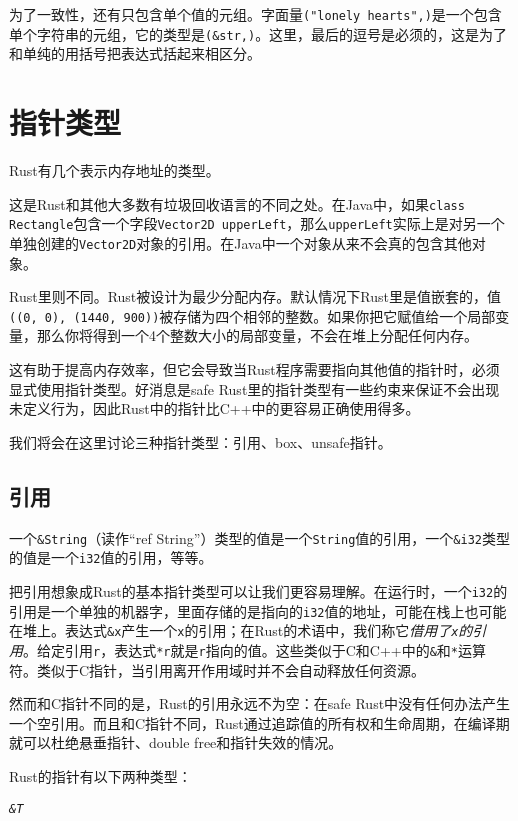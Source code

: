 为了一致性，还有只包含单个值的元组。字面量\texttt{("lonely hearts",)}是一个包含单个字符串的元组，它的类型是\texttt{(\&str,)}。这里，最后的逗号是必须的，这是为了和单纯的用括号把表达式括起来相区分。

\section{指针类型}
Rust有几个表示内存地址的类型。

这是Rust和其他大多数有垃圾回收语言的不同之处。在Java中，如果\texttt{class Rectangle}包含一个字段\texttt{Vector2D upperLeft}，那么\texttt{upperLeft}实际上是对另一个单独创建的\texttt{Vector2D}对象的引用。在Java中一个对象从来不会真的包含其他对象。

Rust里则不同。Rust被设计为最少分配内存。默认情况下Rust里是值嵌套的，值\texttt{((0, 0), (1440, 900))}被存储为四个相邻的整数。如果你把它赋值给一个局部变量，那么你将得到一个4个整数大小的局部变量，不会在堆上分配任何内存。

这有助于提高内存效率，但它会导致当Rust程序需要指向其他值的指针时，必须显式使用指针类型。好消息是safe Rust里的指针类型有一些约束来保证不会出现未定义行为，因此Rust中的指针比C++中的更容易正确使用得多。

我们将会在这里讨论三种指针类型：引用、box、unsafe指针。

\subsection{引用}

一个\texttt{\&String}（读作“ref String”）类型的值是一个\texttt{String}值的引用，一个\texttt{\&i32}类型的值是一个\texttt{i32}值的引用，等等。

把引用想象成Rust的基本指针类型可以让我们更容易理解。在运行时，一个\texttt{i32}的引用是一个单独的机器字，里面存储的是指向的\texttt{i32}值的地址，可能在栈上也可能在堆上。表达式\texttt{\&x}产生一个\texttt{x}的引用；在Rust的术语中，我们称它\emph{借用了\texttt{x}的引用}。给定引用\texttt{r}，表达式\texttt{*r}就是\texttt{r}指向的值。这些类似于C和C++中的\texttt{\&}和\texttt{*}运算符。类似于C指针，当引用离开作用域时并不会自动释放任何资源。

然而和C指针不同的是，Rust的引用永远不为空：在safe Rust中没有任何办法产生一个空引用。而且和C指针不同，Rust通过追踪值的所有权和生命周期，在编译期就可以杜绝悬垂指针、double free和指针失效的情况。

Rust的指针有以下两种类型：
\begin{flushleft}
    \emph{\texttt{\&T}}
\end{flushleft}

